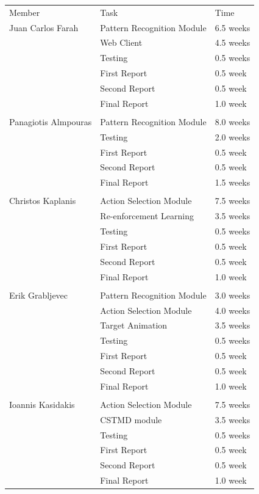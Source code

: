 \documentclass[a4paper,11pt]{article}
\begin{document}
\begin{table}[h]
\centering
\begin{tabular}{|l|l|l|}
\cline{1-3}
Member& Task&  Time  \\ \cline{1-3}
 Juan Carlos Farah&  Pattern Recognition Module&  6.5 weeks  \\ \cline{1-3}
&  Web Client&  4.5 weeks  \\ \cline{1-3}
& Testing& 0.5 weeks \\ \cline{1-3}
&  First Report&  0.5 week  \\ \cline{1-3}
&  Second Report&  0.5 week  \\ \cline{1-3}
&  Final Report& 1.0 week   \\ \cline{1-3}
&  &    \\ \cline{1-3}
Panagiotis Almpouras&  Pattern Recognition Module& 8.0 weeks  \\ \cline{1-3}
&  Testing&  2.0 weeks  \\ \cline{1-3}
&  First Report&  0.5 week  \\ \cline{1-3}
&  Second Report&  0.5 week  \\ \cline{1-3}
&  Final Report&  1.5 weeks  \\ \cline{1-3}
&  &    \\ \cline{1-3}
 Christos Kaplanis&  Action Selection Module&  7.5 weeks  \\ \cline{1-3}
&  Re-enforcement Learning&  3.5 weeks  \\ \cline{1-3}
& Testing& 0.5 weeks \\ \cline{1-3}
&  First Report&  0.5 week  \\ \cline{1-3}
&  Second Report&  0.5 week  \\ \cline{1-3}
&  Final Report&  1.0 week  \\ \cline{1-3}
&  &   \\ \cline{1-3}
Erik Grabljevec&  Pattern Recognition Module&  3.0 weeks  \\ \cline{1-3}
&  Action Selection Module&  4.0 weeks  \\ \cline{1-3}
&  Target Animation&  3.5 weeks  \\ \cline{1-3}
& Testing& 0.5 weeks \\ \cline{1-3}
&  First Report& 0.5 week  \\ \cline{1-3}
&  Second Report&  0.5 week  \\ \cline{1-3}
&  Final Report&  1.0 week  \\ \cline{1-3}
&  &   \\ \cline{1-3}
Ioannis Kasidakis& Action Selection Module& 7.5 weeks  \\ \cline{1-3}
&  CSTMD module& 3.5 weeks    \\ \cline{1-3}
& Testing& 0.5 weeks \\ \cline{1-3}
&  First Report& 0.5 week     \\ \cline{1-3}
&  Second Report& 0.5 week   \\ \cline{1-3}
&  Final Report& 1.0 week   \\ \cline{1-3}

\end{tabular}
\end{table}
\end{document}
